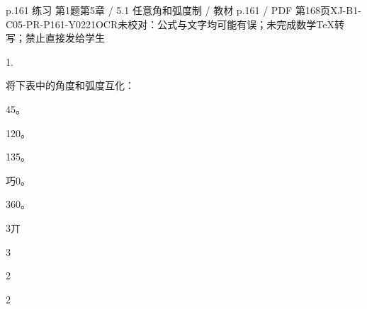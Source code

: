 \begin{bankitem}{p.161 练习 第1题}{第5章 / 5.1 任意角和弧度制 / 教材 p.161 / PDF 第168页}{XJ-B1-C05-PR-P161-Y0221}{OCR未校对：公式与文字均可能有误；未完成数学TeX转写；禁止直接发给学生}
\begin{ocrdraft}
\par
1.
\par
将下表中的角度和弧度互化：
\par
45。
\par
120。
\par
135。
\par
巧0。
\par
360。
\par
3丌
\par
3
\par
2
\par
2
\end{ocrdraft}
\end{bankitem}
